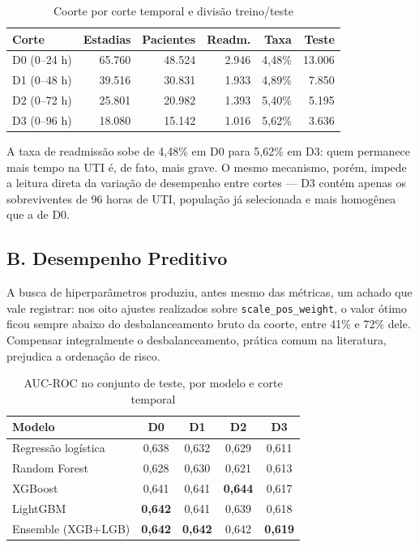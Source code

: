 \documentclass{ieeeaccess}
\begin{document}
\begin{table}[!t]
\caption{Coorte por corte temporal e divisão treino/teste}
\label{tab:coorte}
\centering
\small
\begin{tabular}{lrrrrr}
\hline
\textbf{Corte} & \textbf{Estadias} & \textbf{Pacientes} & \textbf{Readm.} & \textbf{Taxa} & \textbf{Teste} \\
\hline
D0 (0--24 h) & 65.760 & 48.524 & 2.946 & 4,48\% & 13.006 \\
D1 (0--48 h) & 39.516 & 30.831 & 1.933 & 4,89\% & 7.850 \\
D2 (0--72 h) & 25.801 & 20.982 & 1.393 & 5,40\% & 5.195 \\
D3 (0--96 h) & 18.080 & 15.142 & 1.016 & 5,62\% & 3.636 \\
\hline
\end{tabular}
\end{table}

A taxa de readmissão sobe de 4,48\% em D0 para 5,62\% em D3: quem permanece mais tempo na UTI é, de fato, mais grave. O mesmo mecanismo, porém, impede a leitura direta da variação de desempenho entre cortes --- D3 contém apenas os sobreviventes de 96 horas de UTI, população já selecionada e mais homogênea que a de D0.

\subsection*{B. Desempenho Preditivo}
A busca de hiperparâmetros produziu, antes mesmo das métricas, um achado que vale registrar: nos oito ajustes realizados sobre \texttt{scale\_pos\_weight}, o valor ótimo ficou sempre abaixo do desbalanceamento bruto da coorte, entre 41\% e 72\% dele. Compensar integralmente o desbalanceamento, prática comum na literatura, prejudica a ordenação de risco.

\begin{table}[!t]
\caption{AUC-ROC no conjunto de teste, por modelo e corte temporal}
\label{tab:auc}
\centering
\small
\begin{tabular}{lcccc}
\hline
\textbf{Modelo} & \textbf{D0} & \textbf{D1} & \textbf{D2} & \textbf{D3} \\
\hline
Regressão logística & 0,638 & 0,632 & 0,629 & 0,611 \\
Random Forest       & 0,628 & 0,630 & 0,621 & 0,613 \\
XGBoost             & 0,641 & 0,641 & \textbf{0,644} & 0,617 \\
LightGBM            & \textbf{0,642} & 0,641 & 0,639 & 0,618 \\
Ensemble (XGB+LGB)  & \textbf{0,642} & \textbf{0,642} & 0,642 & \textbf{0,619} \\
\hline
\end{tabular}
\end{table}
\end{document}
